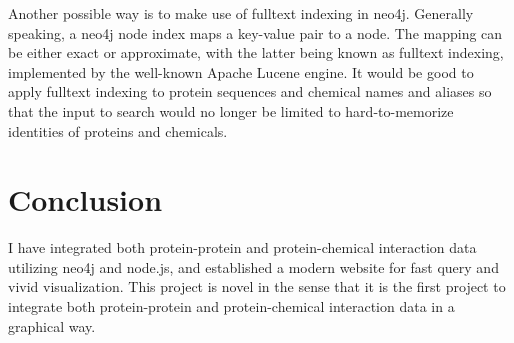 \documentclass[10pt,conference,compsocconf]{../IEEEtran}
\begin{document}
Another possible way is to make use of fulltext indexing in neo4j. Generally speaking, a neo4j node index maps a key-value pair to a node. The mapping can be either exact or approximate, with the latter being known as fulltext indexing, implemented by the well-known Apache Lucene engine. It would be good to apply fulltext indexing to protein sequences and chemical names and aliases so that the input to search would no longer be limited to hard-to-memorize identities of proteins and chemicals.

\section{Conclusion}

I have integrated both protein-protein and protein-chemical interaction data utilizing neo4j and node.js, and established a modern website for fast query and vivid visualization. This project is novel in the sense that it is the first project to integrate both protein-protein and protein-chemical interaction data in a graphical way.



\end{document}
